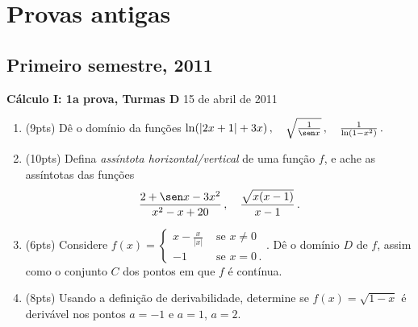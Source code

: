 \chapter{Provas antigas}

\section{Primeiro semestre, 2011}

{\footnotesize
{\bf C\'alculo I: 1a prova, Turmas D}
\hfill 15 de abril de 2011
\begin{enumerate}
\item (9pts) Dê o domínio da funções $\ln (|2x+1|+3x)\,,\quad \sqrt{\frac{1}{\sen x}}\,,\quad \frac{1}{\ln(1-x^2)}\,.$
\item (10pts) Defina \emph{assíntota horizontal/vertical} de uma função $f$, e 
ache as assíntotas das funções 
$$
\frac{2+\sen x-3 x^2}{x^2-x+20}
\,,\quad \frac{\sqrt{x(x-1)}}{x-1}\,.$$
\item (6pts) Considere $f(x)=
\begin{cases}
x-\frac{x}{|x|}&\text{ se }x\neq 0\\
-1&\text{ se }x=0\,.
\end{cases}$.
Dê o domínio  $D$ de $f$, assim como o conjunto $C$ dos pontos em que $f$ é contínua.
\item (8pts) Usando a definição de derivabilidade, determine se $f(x)=\sqrt{1-x}$ é derivável nos pontos $a=-1$ e $a=1$, $a=2$.
\end{enumerate}
}

